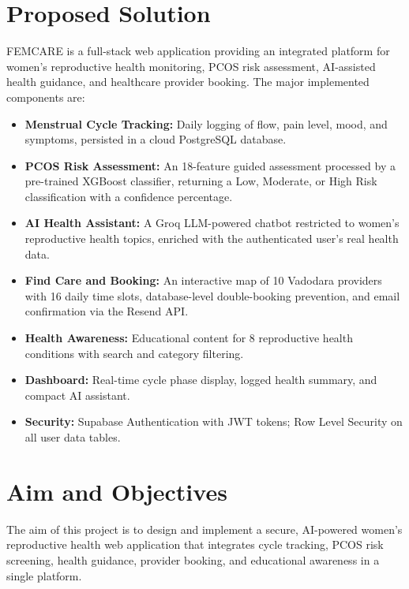 \section{Proposed Solution}
\label{sec:solution}

FEMCARE is a full-stack web application providing an integrated platform for women's reproductive health monitoring, PCOS risk assessment, AI-assisted health guidance, and healthcare provider booking. The major implemented components are:

\begin{itemize}
    \item \textbf{Menstrual Cycle Tracking:} Daily logging of flow, pain level, mood, and symptoms, persisted in a cloud PostgreSQL database.
    \item \textbf{PCOS Risk Assessment:} An 18-feature guided assessment processed by a pre-trained XGBoost classifier, returning a Low, Moderate, or High Risk classification with a confidence percentage.
    \item \textbf{AI Health Assistant:} A Groq LLM-powered chatbot restricted to women's reproductive health topics, enriched with the authenticated user's real health data.
    \item \textbf{Find Care and Booking:} An interactive map of 10 Vadodara providers with 16 daily time slots, database-level double-booking prevention, and email confirmation via the Resend API.
    \item \textbf{Health Awareness:} Educational content for 8 reproductive health conditions with search and category filtering.
    \item \textbf{Dashboard:} Real-time cycle phase display, logged health summary, and compact AI assistant.
    \item \textbf{Security:} Supabase Authentication with JWT tokens; Row Level Security on all user data tables.
\end{itemize}

\section{Aim and Objectives}
\label{sec:aim}

The aim of this project is to design and implement a secure, AI-powered women's reproductive health web application that integrates cycle tracking, PCOS risk screening, health guidance, provider booking, and educational awareness in a single platform.

